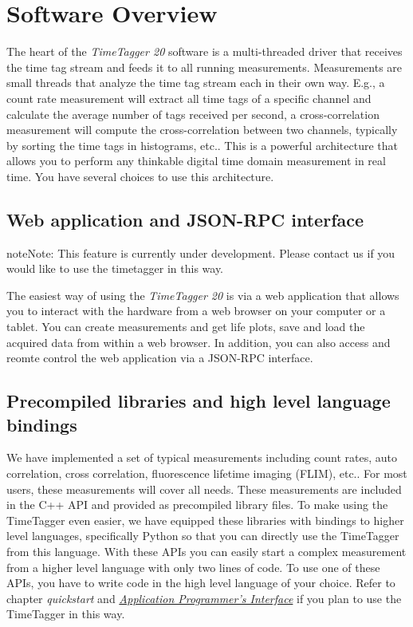 \documentclass[letterpaper,10pt,english]{sphinxmanual}
\begin{document}
\chapter{Software Overview}
\label{sections/software:software-overview}\label{sections/software::doc}
The heart of the \emph{TimeTagger 20} software is a multi-threaded driver
that receives the time tag stream and feeds it to all running
measurements. Measurements are small threads that analyze the time tag stream
each in their own way. E.g., a count rate measurement will extract all time
tags of a specific channel and calculate the average number of tags received per
second, a cross-correlation measurement will compute the cross-correlation between two
channels, typically by sorting the time tags in histograms, etc.. This is a
powerful architecture that allows you to perform any thinkable digital time domain
measurement in real time. You have several choices to use this architecture.


\section{Web application and JSON-RPC interface}
\label{sections/software:web-application-and-json-rpc-interface}
\begin{notice}{note}{Note:}
This feature is currently under development. Please contact us if you would like to use the timetagger in this way.
\end{notice}

The easiest way of using the \emph{TimeTagger 20} is via a web application
that allows you to interact with the hardware from a web browser on your computer
or a tablet. You can create measurements
and get life plots, save and load the acquired data from within a web browser.
In addition, you can also access and reomte control the web application
via a JSON-RPC interface.


\section{Precompiled libraries and high level language bindings}
\label{sections/software:precompiled-libraries-and-high-level-language-bindings}
We have implemented a set of typical measurements including count rates, auto
correlation, cross correlation, fluorescence lifetime imaging (FLIM), etc..
For most users, these measurements
will cover all needs. These measurements are included in
the C++ API and provided as precompiled library files. To make using the
TimeTagger even easier, we have equipped these libraries with
bindings to higher level languages, specifically Python so that you can directly
use the TimeTagger from this language.
With these APIs you can easily start a complex
measurement from a higher level language with only two lines of code.
To use one of these APIs, you have to write code in the high
level language of your choice. Refer to chapter \emph{quickstart} and {\hyperref[sections/api:api]{\emph{Application Programmer's Interface}}}
if you plan to use the TimeTagger in this way.
\end{document}
